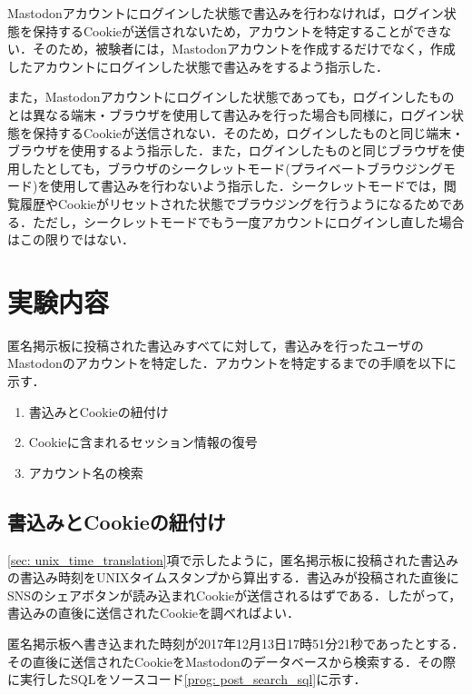\documentclass[10pt, a4paper]{jreport}
\begin{document}
Mastodonアカウントにログインした状態で書込みを行わなければ，ログイン状態を保持するCookieが送信されないため，アカウントを特定することができない．そのため，被験者には，Mastodonアカウントを作成するだけでなく，作成したアカウントにログインした状態で書込みをするよう指示した．

また，Mastodonアカウントにログインした状態であっても，ログインしたものとは異なる端末・ブラウザを使用して書込みを行った場合も同様に，ログイン状態を保持するCookieが送信されない．そのため，ログインしたものと同じ端末・ブラウザを使用するよう指示した．また，ログインしたものと同じブラウザを使用したとしても，ブラウザのシークレットモード(プライベートブラウジングモード)を使用して書込みを行わないよう指示した．シークレットモードでは，閲覧履歴やCookieがリセットされた状態でブラウジングを行うようになるためである．ただし，シークレットモードでもう一度アカウントにログインし直した場合はこの限りではない．

\section{実験内容}\label{sec: exp_flow}
匿名掲示板に投稿された書込みすべてに対して，書込みを行ったユーザのMastodonのアカウントを特定した．アカウントを特定するまでの手順を以下に示す．

\begin{enumerate}
\item{書込みとCookieの紐付け}
\item{Cookieに含まれるセッション情報の復号}
\item{アカウント名の検索}
\end{enumerate}

\subsection{書込みとCookieの紐付け}
\ref{sec: unix_time_translation}項で示したように，匿名掲示板に投稿された書込みの書込み時刻をUNIXタイムスタンプから算出する．書込みが投稿された直後にSNSのシェアボタンが読み込まれCookieが送信されるはずである．したがって，書込みの直後に送信されたCookieを調べればよい．

匿名掲示板へ書き込まれた時刻が2017年12月13日17時51分21秒であったとする．その直後に送信されたCookieをMastodonのデータベースから検索する．その際に実行したSQLをソースコード\ref{prog: post_search_sql}に示す．
\end{document}
